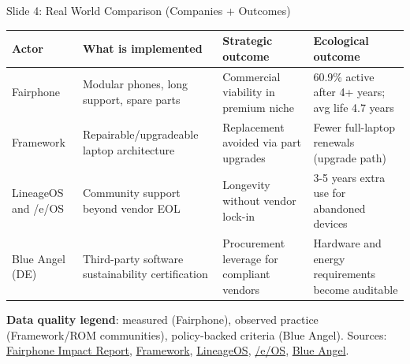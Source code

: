 \documentclass[aspectratio=169]{beamer}
\begin{document}

\begin{frame}{Slide 4: Real World Comparison (Companies + Outcomes)}
\scriptsize
\begin{tabular}{p{2.1cm}p{2.8cm}p{2.4cm}p{3.3cm}}
\toprule
Actor & What is implemented & Strategic outcome & Ecological outcome \\
\midrule
Fairphone & Modular phones, long support, spare parts & Commercial viability in premium niche & 60.9\% active after 4+ years; avg life 4.7 years \\
Framework & Repairable/upgradeable laptop architecture & Replacement avoided via part upgrades & Fewer full-laptop renewals (upgrade path) \\
LineageOS and /e/OS & Community support beyond vendor EOL & Longevity without vendor lock-in & 3-5 years extra use for abandoned devices \\
Blue Angel (DE) & Third-party software sustainability certification & Procurement leverage for compliant vendors & Hardware and energy requirements become auditable \\
\bottomrule
\end{tabular}

\vspace{0.15cm}
\textbf{Data quality legend}: measured (Fairphone), observed practice (Framework/ROM communities), policy-backed criteria (Blue Angel).
\vspace{0.08cm}
\tiny Sources: \href{https://www.fairphone.com/en/impact-report/}{Fairphone Impact Report}, \href{https://frame.work}{Framework}, \href{https://lineageos.org}{LineageOS}, \href{https://e.foundation}{/e/OS}, \href{https://www.blauer-engel.de/en}{Blue Angel}.
\end{frame}

\end{document}
